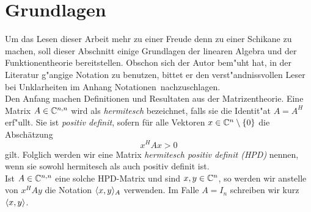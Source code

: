 \section{Grundlagen}

Um das Lesen dieser Arbeit mehr zu einer Freude denn zu einer Schikane zu
machen, soll dieser Abschnitt einige Grundlagen der linearen Algebra und
der Funktionentheorie bereitstellen. Obschon sich der Autor bem"uht hat,
in der Literatur g"angige Notation zu benutzen, bittet er den
verst"andnissvollen Leser bei Unklarheiten im Anhang \glqq Notationen\grqq\
nachzuschlagen.\\

Den Anfang machen Definitionen und Resultaten aus der Matrizentheorie.
Eine Matrix $A\in\Cnn$ wird als \emph{hermitesch} bezeichnet, falls
sie die Identit"at $A=A^H$ erf"ullt. Sie ist \emph{positiv definit}, sofern
für alle Vektoren $x\in\Co$ die Abschätzung
\[
x^H A x > 0
\]
gilt. Folglich werden wir eine Matrix \emph{hermitesch positiv definit (HPD)}
nennen, wenn sie sowohl hermitesch als auch positiv definit ist.\\

Ist $A\in\Cnn$ eine solche HPD-Matrix und sind $x,y\in\Cn$, so werden wir anstelle von
$x^H A y$ die Notation $\sp{A}{x,y}$ verwenden. Im Falle $A=I_n$ schreiben wir
kurz $\sp{}{x,y}$.
